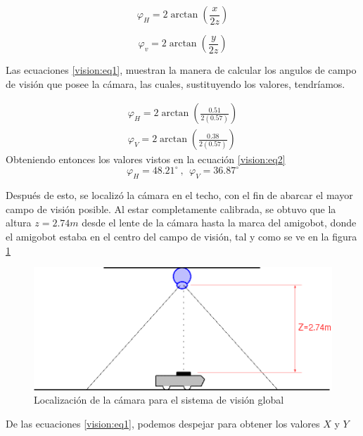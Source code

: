 \documentclass[spanish,10pt,letterpaper, twocolumn]{article}
\begin{document}
\begin{equation*}
	\varphi_H=2\arctan\left(\frac{x}{2z}\right)
\end{equation*}

\begin{equation}
	\label{vision:eq1}
	\varphi_v=2\arctan\left(\frac{y}{2z}\right)
\end{equation} 

Las ecuaciones \eqref{vision:eq1}, muestran la manera de calcular los angulos de campo de visi\'on que posee la c\'amara, las cuales, sustituyendo los valores, tendr\'iamos.

\begin{equation*}
	\begin{matrix}
	\varphi_H=2\arctan\left(\frac{0.51}{2(0.57)}\right)	\\
	\varphi_V=2\arctan\left(\frac{0.38}{2(0.57)}\right)		
	\end{matrix}
\end{equation*}
Obteniendo entonces los valores vistos en la ecuaci\'on \eqref{vision:eq2}
\begin{equation}
	\label{vision:eq2}
	\varphi_H=48.21^{\circ} \ ,	\ \ \varphi_V=36.87^{\circ}
\end{equation}

Despu\'es de esto, se localiz\'o la c\'amara en el techo, con el fin de abarcar el mayor campo de visi\'on posible. Al estar completamente calibrada, se obtuvo que la altura $z=2.74m$ desde el lente de la c\'amara hasta la marca del amigobot, donde el amigobot estaba en el centro del campo de visi\'on, tal y como se ve en la figura \ref{vision:fig2} 

\begin{figure}[ht]
	\includegraphics[scale=0.2]{global.png}
	\caption{Localizaci\'on de la c\'amara para el sistema de visi\'on global}
	\label{vision:fig2}
\end{figure}

De las ecuaciones \eqref{vision:eq1}, podemos despejar para obtener los valores $X$ y $Y$
\end{document}
